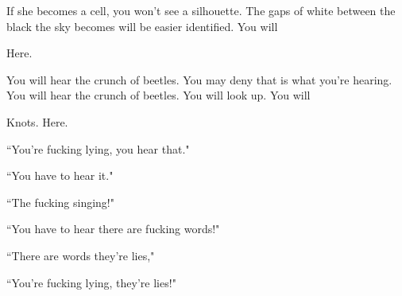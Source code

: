 \documentclass[11pt]{article}
\begin{document}
\vspace*{4\baselineskip}

\begingroup
If she becomes a cell, you won't see a silhouette. The gaps of white between the black the sky becomes will be easier identified. You will 
\endgroup

\vspace*{4\baselineskip}

\begingroup
\begin{center}
Here.
\rightskip\leftskip
\end{center}
\endgroup

\vspace*{4\baselineskip}

\begingroup
You will hear the crunch of beetles. You may deny that is what you're hearing. You will hear the crunch of beetles. You will look up. You will
\endgroup

\vspace*{4\baselineskip}

\begingroup
\begin{center}
Knots. Here.
\rightskip\leftskip
\end{center}
\endgroup

\vspace*{4\baselineskip}

\begingroup
\begin{center}
``You're fucking lying, you hear that."
\end{center}
\endgroup

\begingroup
\begin{center}
``You have to hear it."
\end{center}
\endgroup

\begingroup
\begin{center}
``The fucking singing!"
\end{center}
\endgroup

\begingroup
\begin{center}
``You have to hear there are fucking words!"
\end{center}
\endgroup

\begingroup
\begin{center}
``There are words they're lies,"
\end{center}
\endgroup

\begingroup
\begin{center}
``You're fucking lying, they're lies!"
\end{center}
\endgroup
\end{document}
